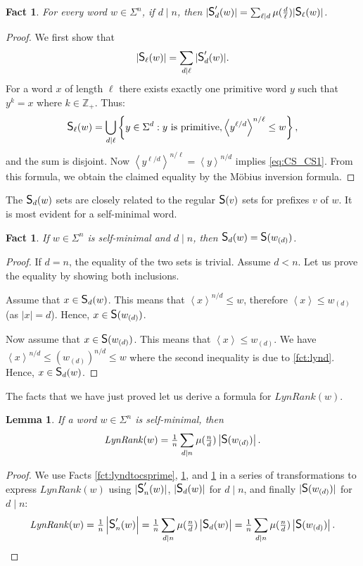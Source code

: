 \documentclass{article}
\newcommand{\mayqed}{}
\newcommand{\integ}{\mathbb{Z}}
\newcommand{\CS}{\mbox{\large{\sf{S}}}}
\newcommand{\Lynd}{\mathit{LynRank}}
\newcommand{\minrot}[1]{\left\langle #1 \right\rangle}
\newtheorem{lemma}[theorem]{Lemma}
\newtheorem{fact}[theorem]{Fact}
\theoremstyle{definition}
\theoremstyle{remark}
\begin{document}
\begin{fact}\label{fct:csprimetocs}
For every word $w\in \Sigma^n$, if $d \mid n$, then $|\CS'_d(w)| = \sum_{\ell \mid d} \mu(\tfrac{d}{\ell}) |\CS_\ell(w)|$.
\end{fact}
\begin{proof}
    We first show that
    \begin{equation}\label{eq:CS_CS1}
      |\CS_\ell(w)| = \sum_{d \mid \ell} |\CS'_d(w)|.
    \end{equation}
    For a word $x$ of length $\ell$ there exists exactly one primitive word $y$ such that $y^k=x$ where $k\in \integ_+$.
    Thus:
    $$\CS_\ell(w) = \bigcup_{d \mid \ell} \left\{y \in \Sigma^d : y\mbox{ is primitive}, \minrot{y^{\ell/d}}^{n/\ell}\le w \right\},$$
    and the sum is disjoint.
    Now $\minrot{y^{\ell/d}}^{n/\ell} = \minrot{y}^{n/d}$ implies \eqref{eq:CS_CS1}.
    From this formula, we obtain the claimed equality by the Möbius inversion formula.
\end{proof}

The $\CS_d(w)$ sets are closely related to the regular $\CS(v)$ sets for prefixes $v$ of $w$.
It is most evident for a self-minimal word.

\begin{fact}\label{fct:C1_C}
  If $w \in \Sigma^n$ is self-minimal and $d \mid n$, then $\CS_d(w) = \CS(w_{(d)})$.
\end{fact}
\begin{proof}
  If $d=n$, the equality of the two sets is trivial. Assume $d<n$.
  Let us prove the equality by showing both inclusions.

  Assume that $x \in \CS_d(w)$.
  This means that $\minrot{x}^{n/d} \le w$, therefore $\minrot{x} \le w_{(d)}$ (as $|x|=d$).
  Hence, $x \in \CS(w_{(d)})$.

  Now assume that $x \in \CS(w_{(d)})$.
  This means that $\minrot{x} \le w_{(d)}$.
  We have
  $\minrot{x}^{n/d} \le (w_{(d)})^{n/d} \le w$
  where the second inequality is due to \cref{fct:lynd}.
  Hence, $x \in \CS_d(w)$.
\mayqed\end{proof}

The facts that we have just proved let us derive a formula for $\Lynd(w)$.

\begin{lemma}\label{lem:formula}
  If a word $w\in \Sigma^n$ is self-minimal, then
  $$\Lynd(w) = \tfrac{1}{n}\sum_{d\mid n}\mu(\tfrac{n}{d})\left|\CS(w_{(d)})\right|.$$
\end{lemma}
\begin{proof}
We use Facts \ref{fct:lyndtocsprime}, \ref{fct:csprimetocs}, and \ref{fct:C1_C} in a series of transformations to express
$\Lynd(w)$ using $|\CS'_n(w)|$, $|\CS_d(w)|$ for $d\mid n$, and finally $|\CS(w_{(d)})|$ for $d \mid n$:
$$\Lynd(w)=\tfrac1n \left|\CS'_n(w)\right| = \tfrac1n \sum_{d \mid n} \mu(\tfrac{n}{d})\left|\CS_d(w)\right| = \tfrac{1}{n}\sum_{d\mid n}\mu(\tfrac{n}{d})\left|\CS(w_{(d)})\right|.$$
\mayqed\end{proof}
\end{document}
